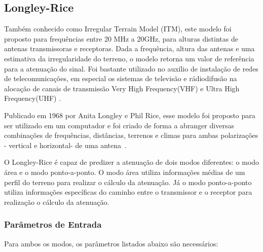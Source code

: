 \subsection{Longley-Rice}

Também conhecido como Irregular Terrain Model (ITM), este modelo foi proposto para frequências entre 20 MHz a 20GHz, para alturas distintas de antenas transmissoras e receptoras. Dada a frequência, altura das antenas e uma estimativa da irregularidade do terreno, o modelo retorna um valor de referência para a atenuação do sinal. Foi bastante utilizado no auxílio de instalação de redes de telecomunicações, em especial os sistemas de televisão e rádiodifusão na alocação de canais de transmissão Very High Frequency(VHF)
e Ultra High Frequency(UHF)
.

Publicado em 1968 por Anita Longley e Phil Rice, esse modelo foi proposto para ser utilizado em um computador e foi criado de forma a abranger diversas combinações de frequências, distâncias, terrenos e climas para ambas polarizações - vertical e horizontal- de uma antena~\cite{longleyrice}.

O Longley-Rice é capaz de predizer a atenuação de dois modos diferentes: o modo área e o modo ponto-a-ponto. O modo área utiliza informações médias de um perfil do terreno para realizar o cálculo da atenuação. Já o modo ponto-a-ponto utiliza informações específicas do caminho entre o transmissor e o receptor para realização o cálculo da atenuação.

\subsubsection{Parâmetros de Entrada}

Para ambos os modos, os parâmetros listados abaixo são necessários:


